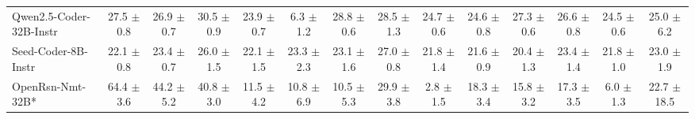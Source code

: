 \documentclass{llmxive}
\begin{document}
\begin{table}[t]
{\begin{tabular}{l *{13}{c}}


Qwen2.5-Coder-32B-Instr &
 27.5 {\tiny$\pm$ 0.8} &	
 26.9 {\tiny$\pm$ 0.7} &	
 30.5 {\tiny$\pm$ 0.9} & 
 23.9 {\tiny$\pm$ 0.7} & 
 6.3 {\tiny$\pm$ 1.2} &
 28.8 {\tiny$\pm$ 0.6} &	
 28.5 {\tiny$\pm$ 1.3} &	
 24.7 {\tiny$\pm$ 0.6} &	
 24.6 {\tiny$\pm$ 0.8} &	
 27.3 {\tiny$\pm$ 0.6} &	
 26.6 {\tiny$\pm$ 0.8} &
 24.5 {\tiny$\pm$ 0.6} &	
 25.0 {\tiny$\pm$ 6.2} \\


\rowcolor{gray!10}
Seed-Coder-8B-Instr 
 & 22.1 {\tiny$\pm$ 0.8} & 
 23.4 {\tiny$\pm$ 0.7} & 
 26.0 {\tiny$\pm$ 1.5} & 
 22.1 {\tiny$\pm$ 1.5} & 
 23.3 {\tiny$\pm$ 2.3} & 
 23.1 {\tiny$\pm$ 1.6} & 
 27.0 {\tiny$\pm$ 0.8} & 
 21.8 {\tiny$\pm$ 1.4} & 
 21.6 {\tiny$\pm$ 0.9} & 
 20.4 {\tiny$\pm$ 1.3} & 
 23.4 {\tiny$\pm$ 1.4} & 
 21.8 {\tiny$\pm$ 1.0} & 
 23.0 {\tiny$\pm$ 1.9} \\



OpenRsn-Nmt-32B* &
64.4 {\tiny$\pm$ 3.6} & 
44.2 {\tiny$\pm$ 5.2} & 
40.8 {\tiny$\pm$ 3.0} & 
11.5 {\tiny$\pm$ 4.2} &
10.8 {\tiny$\pm$ 6.9} & 
10.5 {\tiny$\pm$ 5.3} & 
29.9 {\tiny$\pm$ 3.8} & 
2.8 {\tiny$\pm$ 1.5} &
18.3 {\tiny$\pm$ 3.4} & 
15.8 {\tiny$\pm$ 3.2} & 
17.3 {\tiny$\pm$ 3.5} & 
6.0 {\tiny$\pm$ 1.3} &
22.7 {\tiny$\pm$ 18.5} \\




\end{tabular}}
\end{table}
\end{document}
